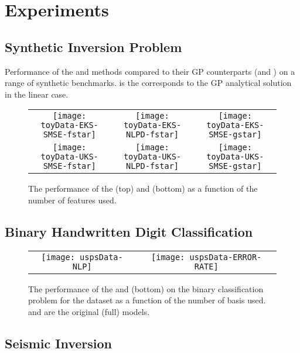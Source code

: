 \section{Experiments}

\subsection{Synthetic Inversion Problem}
%
\begin{table*}
\caption{Performance of the \eks and \uks methods compared to their GP counterparts (\egp and \ugp) on a range of synthetic benchmarks. 
\gp is the corresponds to the GP analytical solution in the linear case.
}
\begin{center}

\end{center}
\end{table*}
%
\begin{figure*}
\centering
\begin{tabular}{c c c}
\texttt{[image: toyData-EKS-SMSE-fstar]} &
\texttt{[image: toyData-EKS-NLPD-fstar]} &
\texttt{[image: toyData-EKS-SMSE-gstar]} \\
\texttt{[image: toyData-UKS-SMSE-fstar]} &
\texttt{[image: toyData-UKS-NLPD-fstar]} &
\texttt{[image: toyData-UKS-SMSE-gstar]} \\
\end{tabular}
\caption{The performance of the \eks (top) and \uks (bottom) as a function of the number of features used. }
\end{figure*}
%
\subsection{Binary Handwritten Digit Classification}
\begin{figure*}
\centering
\begin{tabular}{c c}
\texttt{[image: uspsData-NLP]}  &
\texttt{[image: uspsData-ERROR-RATE]}  
\end{tabular}
\caption{The performance of the \eks and \uks (bottom) on the binary classification problem for the \usps dataset as a function of 
the number of  basis used. \egp and \ugp are the original (full) \gp models.}
\end{figure*}


\subsection{Seismic Inversion}

